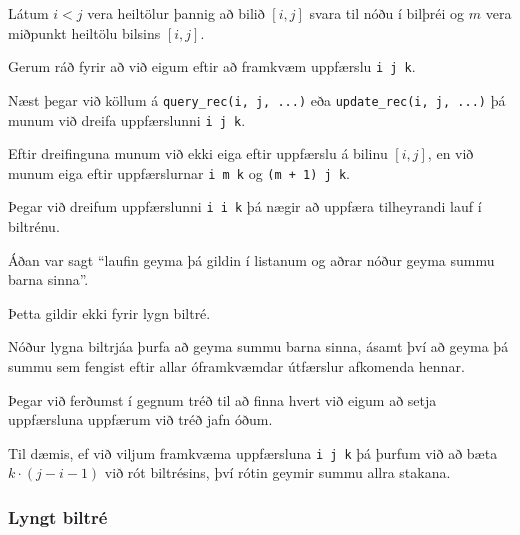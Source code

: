 {
	{
		\item<1-> Látum $i < j$ vera heiltölur þannig að bilið $[i, j]$ svara til nóðu í bilþréi og $m$ vera miðpunkt heiltölu bilsins $[i, j]$.
		\item<2-> Gerum ráð fyrir að við eigum eftir að framkvæm uppfærslu \texttt{i j k}.
		\item<3-> Næst þegar við köllum á \texttt{query\_rec(i, j, ...)} eða \texttt{update\_rec(i, j, ...)}
					þá munum við dreifa uppfærslunni \texttt{i j k}.
		\item<4-> Eftir dreifinguna munum við ekki eiga eftir uppfærslu á bilinu $[i, j]$, en við munum eiga eftir uppfærslurnar
					\texttt{i m k} og \texttt{(m + 1) j k}.
		\item<5-> Þegar við dreifum uppfærslunni \texttt{i i k} þá nægir að uppfæra tilheyrandi lauf í biltrénu.
	}
}

{
	{
		\item<1-> Áðan var sagt ``laufin geyma þá gildin í listanum og aðrar nóður geyma summu barna sinna''.
		\item<2-> Þetta gildir ekki fyrir lygn biltré.
		\item<3-> Nóður lygna biltrjáa þurfa að geyma summu barna sinna,
					ásamt því að geyma þá summu sem fengist eftir allar óframkvæmdar útfærslur afkomenda hennar.
		\item<4-> Þegar við ferðumst í gegnum tréð til að finna hvert við eigum að setja uppfærsluna uppfærum við tréð jafn óðum.
		\item<5-> Til dæmis, ef við viljum framkvæma uppfærsluna \texttt{i j k} þá þurfum við að bæta $k \cdot (j - i - 1)$ við rót biltrésins,
					því rótin geymir summu allra stakana.
	}
}

{
	\frametitle{Lyngt biltré}
}

{
}


